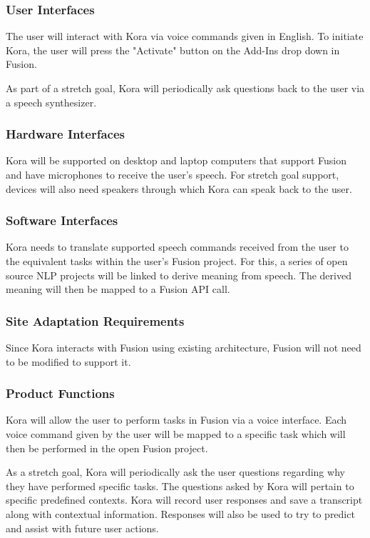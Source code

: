 \documentclass[onecolumn, draftclsnofoot,10pt, compsoc]{IEEEtran}
\def \botname{Kora\xspace}
\begin{document}
	\subsubsection{User Interfaces}
	The user will interact with \botname via voice commands given in English.
	To initiate \botname, the user will press the "Activate" button on the Add-Ins drop down in Fusion.

	As part of a stretch goal, \botname will periodically ask questions back to the user via a speech synthesizer.

	\subsubsection{Hardware Interfaces}
	\botname will be supported on desktop and laptop computers that support Fusion and have microphones to receive the user's speech.
	For stretch goal support, devices will also need speakers through which \botname can speak back to the user.

	\subsubsection{Software Interfaces}
	\botname needs to translate supported speech commands received from the user to the equivalent tasks within the user's Fusion project.
	For this, a series of open source NLP projects will be linked to derive meaning from speech.
	The derived meaning will then be mapped to a Fusion API call.

	\subsubsection{Site Adaptation Requirements}
	Since \botname interacts with Fusion using existing architecture, Fusion will not need to be modified to support it.

	\subsubsection{Product Functions}
	\botname will allow the user to perform tasks in Fusion via a voice interface.
	Each voice command given by the user will be mapped to a specific task which will then be performed in the open Fusion project.

	As a stretch goal, \botname will periodically ask the user questions regarding why they have performed specific tasks.
	The questions asked by \botname will pertain to specific predefined contexts.
	\botname will record user responses and save a transcript along with contextual information.
	Responses will also be used to try to predict and assist with future user actions.
\end{document}
